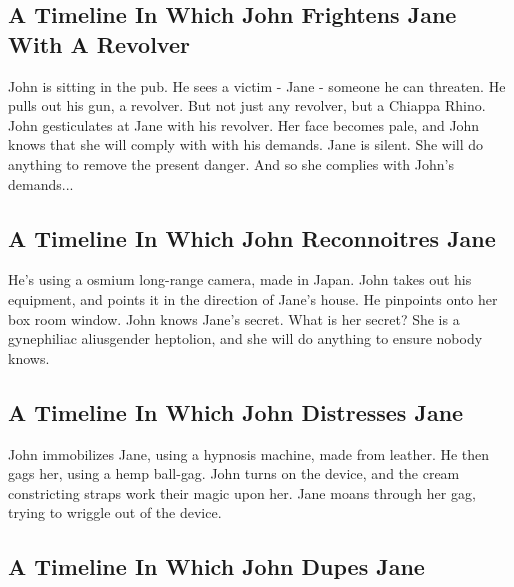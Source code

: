 \documentclass{article}
\begin{document}
\subsection{A Timeline In Which John Frightens Jane With A Revolver}


John is sitting in the pub.
He sees a victim {-} Jane {-} someone he can threaten. He pulls out his gun, a revolver.
But not just any revolver, but a Chiappa Rhino.
John gesticulates at Jane with his revolver. Her face becomes pale, and John knows that she will comply with with his demands.
Jane is silent. She will do anything to remove the present danger. And so she complies with John's demands...
\subsection{A Timeline In Which John Reconnoitres Jane}


He's using a osmium long{-}range camera, made in Japan.
John takes out his equipment, and points it in the direction of Jane's house. He pinpoints onto her box room window.
John knows Jane's secret. What is her secret? She is a gynephiliac aliusgender heptolion, and she will do anything to ensure nobody knows.
\subsection{A Timeline In Which John Distresses Jane}


John immobilizes Jane, using a hypnosis machine, made from leather.
He then gags her, using a hemp ball{-}gag.
John turns on the device, and the cream constricting straps work their magic upon her.
Jane moans through her gag, trying to wriggle out of the device.
\subsection{A Timeline In Which John Dupes Jane}
\end{document}
